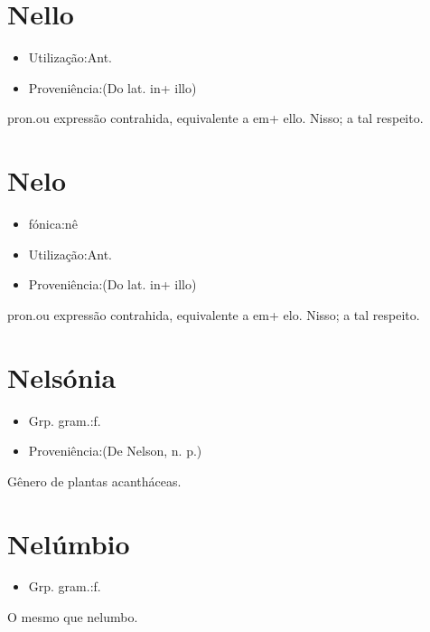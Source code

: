 \section{Nello}
\begin{itemize}
\item {Utilização:Ant.}
\end{itemize}
\begin{itemize}
\item {Proveniência:(Do lat. \textunderscore in\textunderscore  + \textunderscore illo\textunderscore )}
\end{itemize}
\textunderscore pron.\textunderscore  ou expressão contrahida, equivalente a \textunderscore em\textunderscore  + \textunderscore ello\textunderscore .
Nisso; a tal respeito.
\section{Nelo}
\begin{itemize}
\item {fónica:nê}
\end{itemize}
\begin{itemize}
\item {Utilização:Ant.}
\end{itemize}
\begin{itemize}
\item {Proveniência:(Do lat. \textunderscore in\textunderscore  + \textunderscore illo\textunderscore )}
\end{itemize}
\textunderscore pron.\textunderscore  ou expressão contrahida, equivalente a \textunderscore em\textunderscore  + \textunderscore elo\textunderscore .
Nisso; a tal respeito.
\section{Nelsónia}
\begin{itemize}
\item {Grp. gram.:f.}
\end{itemize}
\begin{itemize}
\item {Proveniência:(De \textunderscore Nelson\textunderscore , n. p.)}
\end{itemize}
Gênero de plantas acantháceas.
\section{Nelúmbio}
\begin{itemize}
\item {Grp. gram.:f.}
\end{itemize}
O mesmo que \textunderscore nelumbo\textunderscore .
